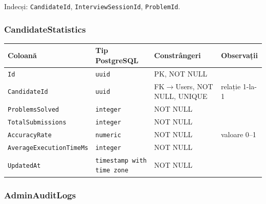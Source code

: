 \medskip
Indecși: \texttt{CandidateId}, \texttt{InterviewSessionId}, \texttt{ProblemId}.

\subsubsection{CandidateStatistics}

\begin{tabular}{llll}
\hline
\textbf{Coloană} & \textbf{Tip PostgreSQL} & \textbf{Constrângeri} & \textbf{Observații} \\
\hline
\texttt{Id}                     & \texttt{uuid}    & PK, NOT NULL                 & \\
\texttt{CandidateId}            & \texttt{uuid}    & FK$\rightarrow$Users, NOT NULL, UNIQUE   & relație 1-la-1 \\
\texttt{ProblemsSolved}         & \texttt{integer} & NOT NULL                     & \\
\texttt{TotalSubmissions}       & \texttt{integer} & NOT NULL                     & \\
\texttt{AccuracyRate}           & \texttt{numeric} & NOT NULL                     & valoare 0–1 \\
\texttt{AverageExecutionTimeMs} & \texttt{integer} & NOT NULL                     & \\
\texttt{UpdatedAt}              & \texttt{timestamp with time zone} & NOT NULL      & \\
\hline
\end{tabular}

\subsubsection{AdminAuditLogs}


